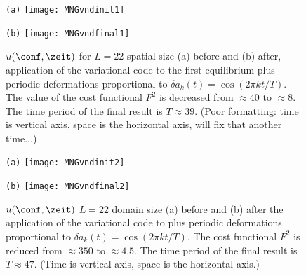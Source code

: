 \begin{description}
\begin{figure}[ht]
\begin{minipage}[height=.32\textheight]{.45\textwidth}
\centering \small{\texttt{(a)}}
\texttt{[image: MNGvndinit1]}
\end{minipage}
\begin{minipage}[height=.50\textheight]{.45\textwidth}
\centering \small{\texttt{(b)}}
\texttt{[image: MNGvndfinal1]}
\end{minipage}
\caption{ \label{fig:MNGVND1} $u(\conf, \zeit)$ for $L=22$ spatial size
(a) before and (b) after, application of the variational {\descent}
code to the first equilibrium plus periodic deformations
proportional to $\delta a_k(t) = \cos (2 \pi k t/T)$.
The value of the cost functional $F^2$ is decreased from $\approx 40$ to
$\approx 8$. The time period of the final result is $T \approx 39$. (Poor
formatting: time is vertical axis, space is the horizontal axis, will fix
that another time...)
}
\end{figure}
\begin{figure}[ht]
\begin{minipage}[height=.32\textheight]{.45\textwidth}
\centering \small{\texttt{(a)}}
\texttt{[image: MNGvndinit2]}
\end{minipage}
\begin{minipage}[height=.50\textheight]{.45\textwidth}
\centering \small{\texttt{(b)}}
\texttt{[image: MNGvndfinal2]}
\end{minipage}
\caption{ \label{fig:MNGVND2}
$u(\conf, \zeit)$ $L=22$ domain size
(a) before and
(b) after the application of the variational {\descent} code to  plus
periodic deformations proportional to $\delta a_k(t) = \cos (2 \pi k t/T)$. The
cost functional $F^2$ is reduced from $\approx 350$ to $\approx 4.5$. The time
period of the final result is $T \approx 47$. (Time is vertical axis, space is
the horizontal axis.)
}

\end{figure}

\end{description}
